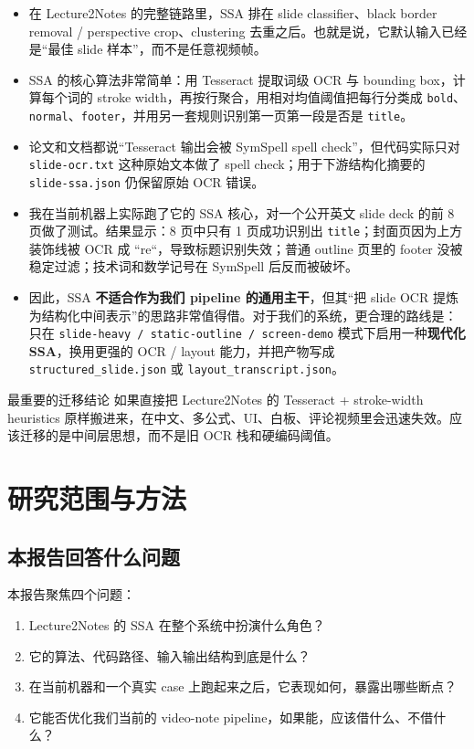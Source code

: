 \documentclass[a4paper]{article}
\begin{document}
\begin{itemize}
\item 在 Lecture2Notes 的完整链路里，SSA 排在 slide classifier、black border removal / perspective crop、clustering 去重之后。也就是说，它默认输入已经是“最佳 slide 样本”，而不是任意视频帧。
\item SSA 的核心算法非常简单：用 Tesseract 提取词级 OCR 与 bounding box，计算每个词的 stroke width，再按行聚合，用相对均值阈值把每行分类成 \texttt{bold}、\texttt{normal}、\texttt{footer}，并用另一套规则识别第一页第一段是否是 \texttt{title}。
\item 论文和文档都说“Tesseract 输出会被 SymSpell spell check”，但代码实际只对 \texttt{slide-ocr.txt} 这种原始文本做了 spell check；用于下游结构化摘要的 \texttt{slide-ssa.json} 仍保留原始 OCR 错误。
\item 我在当前机器上实际跑了它的 SSA 核心，对一个公开英文 slide deck 的前 8 页做了测试。结果显示：8 页中只有 1 页成功识别出 \texttt{title}；封面页因为上方装饰线被 OCR 成 ``re``，导致标题识别失效；普通 outline 页里的 footer 没被稳定过滤；技术词和数学记号在 SymSpell 后反而被破坏。
\item 因此，SSA \textbf{不适合作为我们 pipeline 的通用主干}，但其“把 slide OCR 提炼为结构化中间表示”的思路非常值得借。对于我们的系统，更合理的路线是：只在 \texttt{slide-heavy / static-outline / screen-demo} 模式下启用一种\textbf{现代化 SSA}，换用更强的 OCR / layout 能力，并把产物写成 \texttt{structured\_slide.json} 或 \texttt{layout\_transcript.json}。
\end{itemize}

\begin{riskbox}{最重要的迁移结论}
如果直接把 Lecture2Notes 的 Tesseract + stroke-width heuristics 原样搬进来，在中文、多公式、UI、白板、评论视频里会迅速失效。应该迁移的是中间层思想，而不是旧 OCR 栈和硬编码阈值。
\end{riskbox}

\section{研究范围与方法}

\subsection{本报告回答什么问题}

本报告聚焦四个问题：

\begin{enumerate}
\item Lecture2Notes 的 SSA 在整个系统中扮演什么角色？
\item 它的算法、代码路径、输入输出结构到底是什么？
\item 在当前机器和一个真实 case 上跑起来之后，它表现如何，暴露出哪些断点？
\item 它能否优化我们当前的 video-note pipeline，如果能，应该借什么、不借什么？
\end{enumerate}
\end{document}
